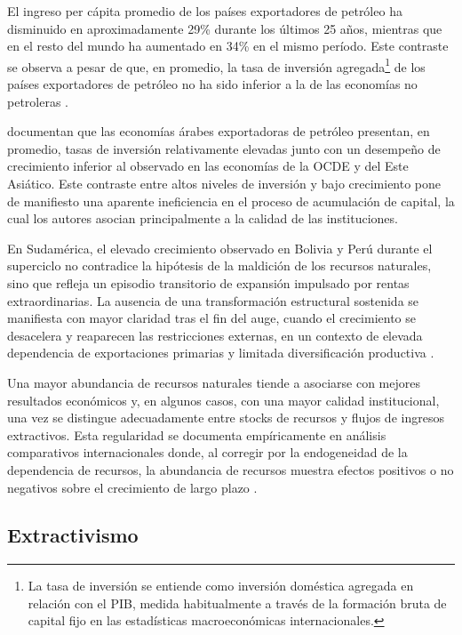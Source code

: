 \documentclass[../../PTFM.tex]{subfiles}
\begin{document}
	El ingreso per cápita promedio de los países exportadores de petróleo ha disminuido en aproximadamente 29\% durante los últimos 25 años, mientras que en el resto del mundo ha aumentado en 34\% en el mismo período. Este contraste se observa a pesar de que, en promedio, la tasa de inversión agregada\footnote{La tasa de inversión se entiende como inversión doméstica agregada en relación con el PIB, medida habitualmente a través de la formación bruta de capital fijo en las estadísticas macroeconómicas internacionales.} de los países exportadores de petróleo no ha sido inferior a la de las economías no petroleras \parencite{Nili2007}.
	
	\textcite{Sala-i-Martin2002} documentan que las economías árabes exportadoras de petróleo presentan, en promedio, tasas de inversión relativamente elevadas junto con un desempeño de crecimiento inferior al observado en las economías de la OCDE y del Este Asiático. Este contraste entre altos niveles de inversión y bajo crecimiento pone de manifiesto una aparente ineficiencia en el proceso de acumulación de capital, la cual los autores asocian principalmente a la calidad de las instituciones.
	
	En Sudamérica, el elevado crecimiento observado en Bolivia y Perú durante el superciclo no contradice la hipótesis de la maldición de los recursos naturales, sino que refleja un episodio transitorio de expansión impulsado por rentas extraordinarias. La ausencia de una transformación estructural sostenida se manifiesta con mayor claridad tras el fin del auge, cuando el crecimiento se desacelera y reaparecen las restricciones externas, en un contexto de elevada dependencia de exportaciones primarias y limitada diversificación productiva \parencite{Agramont-Lechn2024}.
	
	Una mayor abundancia de recursos naturales tiende a asociarse con mejores resultados económicos y, en algunos casos, con una mayor calidad institucional, una vez se distingue adecuadamente entre stocks de recursos y flujos de ingresos extractivos. Esta regularidad se documenta empíricamente en análisis comparativos internacionales donde, al corregir por la endogeneidad de la dependencia de recursos, la abundancia de recursos muestra efectos positivos o no negativos sobre el crecimiento de largo plazo \parencite{Brunnschweiler2008}.
	
	\subsection{Extractivismo}
	\label{subsec:extractivismo}
	
\end{document}
